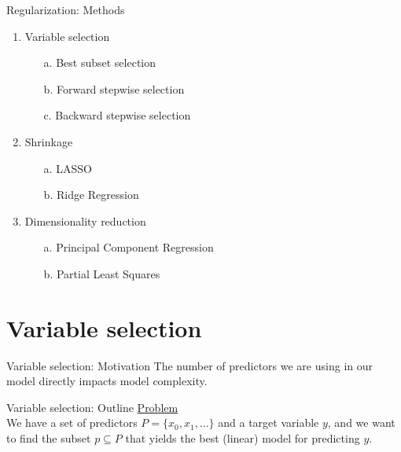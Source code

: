 \documentclass[8pt]{beamer}
\begin{document}
    \begin{frame}{Regularization: Methods}
        \begin{enumerate}
            \item Variable selection
            \begin{enumerate}
                \item[a.] Best subset selection
                \item[b.] Forward stepwise selection
                \item[c.] Backward stepwise selection
            \end{enumerate}
            \item Shrinkage
            \begin{enumerate}
                \item[a.] LASSO
                \item[b.] Ridge Regression
            \end{enumerate}
            \item Dimensionality reduction
            \begin{enumerate}
                \item[a.] Principal Component Regression
                \item[b.] Partial Least Squares
            \end{enumerate}
        \end{enumerate}
    \end{frame}

    \section{Variable selection}

    \begin{frame}{Variable selection: Motivation}
        \centering
        The number of predictors we are using in our model directly impacts model complexity.
    \end{frame}

    \begin{frame}[t]{Variable selection: Outline} %
        \underline{Problem}\\
        We have a set of predictors $P=\{x_0, x_1, ...\}$ and a target variable $y$, and we want to find the subset $p \subseteq P$ that yields the best (linear) model for predicting $y$.\\
    \end{frame}
\end{document}
